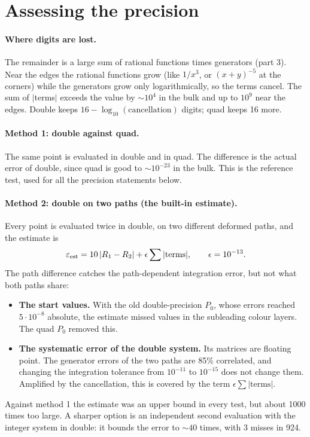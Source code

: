 \documentclass[11pt]{article}
\begin{document}
\section{Assessing the precision}\label{sec:prec}
\paragraph{Where digits are lost.} The remainder is a large sum of rational functions times generators (part 3). Near
the edges the rational functions grow (like $1/x^3$, or $(x+y)^{-5}$ at the corners) while the generators grow only
logarithmically, so the terms cancel. The sum of $|$terms$|$ exceeds the value by $\sim10^4$ in the bulk and up to
$10^9$ near the edges. Double keeps $16-\log_{10}(\text{cancellation})$ digits; quad keeps 16 more.

\paragraph{Method 1: double against quad.} The same point is evaluated in double and in quad. The difference is the
actual error of double, since quad is good to $\sim10^{-23}$ in the bulk. This is the reference test, used for all
the precision statements below.

\paragraph{Method 2: double on two paths (the built-in estimate).} Every point is evaluated twice in double, on two
different deformed paths, and the estimate is
\[
  \varepsilon_{\rm est}=10\,|R_1-R_2|+\epsilon\sum|\text{terms}|,\qquad\epsilon=10^{-13}.
\]
The path difference catches the path-dependent integration error, but not what both paths share:
\begin{itemize}
\item \textbf{The start values.} With the old double-precision $P_0$, whose errors reached $5\cdot10^{-8}$ absolute,
  the estimate missed values in the subleading colour layers. The quad $P_0$ removed this.
\item \textbf{The systematic error of the double system.} Its matrices are floating point. The generator errors of
  the two paths are 85\% correlated, and changing the integration tolerance from $10^{-11}$ to $10^{-15}$ does not
  change them. Amplified by the cancellation, this is covered by the term $\epsilon\sum|\text{terms}|$.
\end{itemize}
Against method 1 the estimate was an upper bound in every test, but about 1000 times too large. A sharper option is
an independent second evaluation with the integer system in double: it bounds the error to $\sim40$ times, with
3 misses in 924.
\end{document}
